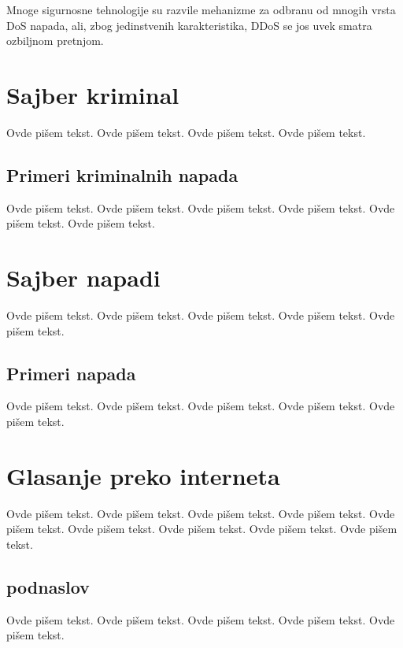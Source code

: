 \documentclass[a4paper]{article}
\begin{document}
Mnoge sigurnosne tehnologije su razvile mehanizme za odbranu od mnogih vrsta DoS napada, ali, zbog jedinstvenih karakteristika, DDoS se jos uvek smatra ozbiljnom pretnjom.

\section{Sajber kriminal}
\label{sec:sajber_kriminal}

Ovde pišem tekst. 
Ovde pišem tekst. 
Ovde pišem tekst. 
Ovde pišem tekst. 

\subsection{Primeri kriminalnih napada}
\label{subsec:primeri_krimi_napada}

Ovde pišem tekst. 
Ovde pišem tekst. 
Ovde pišem tekst. 
Ovde pišem tekst. 
Ovde pišem tekst. 
Ovde pišem tekst. 

\section{Sajber napadi}
\label{sec:sajber_napadi}

Ovde pišem tekst. 
Ovde pišem tekst. 
Ovde pišem tekst. 
Ovde pišem tekst. 
Ovde pišem tekst. 

\subsection{Primeri napada}
\label{subsec:primeri_napada}

Ovde pišem tekst. 
Ovde pišem tekst. 
Ovde pišem tekst. 
Ovde pišem tekst. 
Ovde pišem tekst. 


\section{Glasanje preko interneta}
\label{sec:glasanje}

Ovde pišem tekst. 
Ovde pišem tekst. 
Ovde pišem tekst. 
Ovde pišem tekst. 
Ovde pišem tekst. 
Ovde pišem tekst. 
Ovde pišem tekst. 
Ovde pišem tekst. 
Ovde pišem tekst. 

\subsection{podnaslov}
\label{subsec:podnaslov}

Ovde pišem tekst. 
Ovde pišem tekst. 
Ovde pišem tekst. 
Ovde pišem tekst. 
Ovde pišem tekst.
\end{document}
